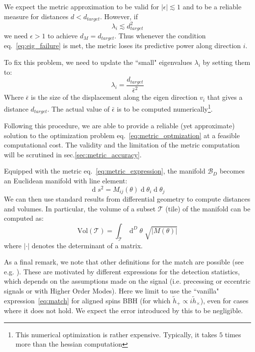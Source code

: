 \documentclass[twocolumn,showpacs,preprintnumbers,nofootinbib,prd,
superscriptaddress,10pt]{revtex4-1}
\renewcommand{\d}[1]{\ensuremath{\operatorname{d}\!{#1}}}
\renewcommand{\dvol}[2]{\ensuremath{\operatorname{d}^{#2}\!{#1}}}
\begin{document}
We expect the metric approximation to be valid for $|\epsilon| \lesssim 1$ and to be a reliable measure for distances $d<d_{target}$. However, if 
\begin{equation} \label{eq:eig_failure}
	\lambda_i \lesssim d^2_{target}
\end{equation}
we need $\epsilon >1$ to achieve $d_M = d_{target}$.
Thus whenever the condition eq.~\eqref{eq:eig_failure} is met, the metric loses its predictive power along direction $i$.

To fix this problem, we need to update the ``small" eigenvalues $\lambda_i$ by setting them to:
\begin{equation} \label{eq:new_lambda}
	\lambda_i = \frac{d_{target}}{\bar{\epsilon}^2}
\end{equation}
Where $\bar{\epsilon}$ is the size of the displacement along the eigen direction $v_i$ that gives a distance $d_{target}$. The actual value of  $\bar{\epsilon}$ is to be computed numerically\footnote{This numerical optimization is rather expensive. Typically, it takes $5$ times more than the hessian computation}.

Following this procedure, we are able to provide a reliable (yet approximate) solution to the optimization problem eq.~\eqref{eq:metric_optmization} at a feasible computational cost.
The validity and the limitation of the metric computation will be scrutined in sec.\ref{sec:metric_accuracy}.

Equipped with the metric eq.~\eqref{eq:metric_expression}, the manifold $\mathcal{B}_D$ becomes an Euclidean manifold with line element:
\begin{equation}\label{eq:line_element}
	\d{s^2} = M_{ij}(\theta) \d{\theta_i} \d{\theta_j}
\end{equation}
We can then use standard results from differential geometry to compute distances and volumes. In particular, the volume of a subset $\mathcal{T}$ (tile) of the manifold can be computed as:
\begin{equation}\label{eq:volume_tile}
	\text{Vol}(\mathcal{T}) = \int_\mathcal{T} \dvol{\theta}{D} \; \sqrt{|M(\theta)|}
\end{equation}
where $|\cdot|$ denotes the determinant of a matrix.

As a final remark, we note that other definitions for the match are possible (see e.g. \cite{sky_maxed,symphony}). These are motivated by different expressions for the detection statistics, which depends on the assumptions made on the signal (i.e. precessing or eccentric signals or with Higher Order Modes). Here we limit to use the ``vanilla" expression~\eqref{eq:match} for aligned spins BBH (for which $\tilde{h}_+ \propto i \tilde{h}_\times$), even for cases where it does not hold. We expect the error introduced by this to be negligible.
\end{document}
